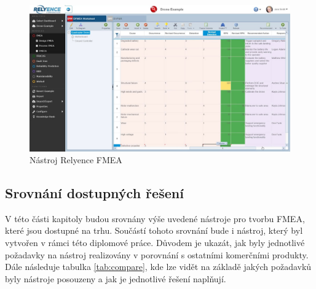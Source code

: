 \begin{figure}[h]
\centering
	\includegraphics[width=1.0\textwidth]{Figures/relyence.jpg}
	\caption{Nástroj Relyence FMEA }
	\label{fig:relyence}
\end{figure}

\subsection{Srovnání dostupných řešení}
V této části kapitoly budou srovnány výše uvedené nástroje pro tvorbu FMEA, které jsou dostupné na trhu. Součástí tohoto srovnání bude i nástroj, který byl vytvořen v rámci této diplomové práce. Důvodem je ukazát, jak byly jednotlivé požadavky na nástroj realizovány v porovnání s ostatními komerčními produkty. Dále následuje tabulka \ref{tab:compare}, kde lze vidět na základě jakých požadavků byly nástroje posouzeny a jak je jednotlivé řešení naplňují.
\break
\break
\break
\break
\break
\break

